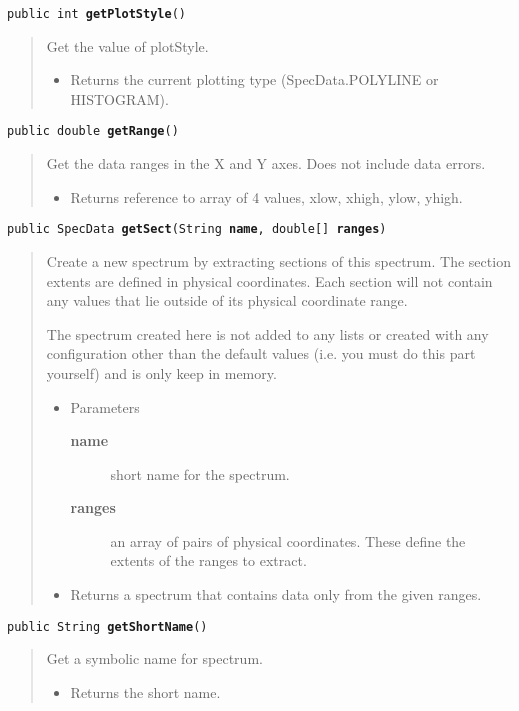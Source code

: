 \documentclass[twoside,11pt,nolof]{starlink}
\providecommand{\method}[1]{\texttt{#1}}
\newenvironment{desc}{\begin{quote}}{\end{quote}}
\begin{document}
\method{public int \textbf{getPlotStyle}()\label{l63}\label{l64}}
\begin{desc}Get the value of plotStyle.
\begin{itemize}
\item{Returns the current plotting type (SpecData.POLYLINE or
            HISTOGRAM). }
\end{itemize}
\end{desc}

\method{public double \textbf{getRange}()\label{l65}\label{l66}}
\begin{desc}Get the data ranges in the X and Y axes. Does not include data
 errors.
\begin{itemize}
\item{Returns reference to array of 4 values, xlow, xhigh, ylow, yhigh. }
\end{itemize}
\end{desc}

\method{public SpecData \textbf{getSect}(\texttt{String} \textbf{name}, \texttt{double[]} \textbf{ranges})\label{l67}\label{l68}}
\begin{desc}Create a new spectrum by extracting sections of this spectrum.
 The section extents are defined in physical coordinates.
 Each section will not contain any values that lie outside of
 its physical coordinate range.

 The spectrum created here is not added to any lists or created
 with any configuration other than the default values (i.e. you
 must do this part yourself) and is only keep in memory.
\begin{itemize}
\item{Parameters
  \begin{description}
   \item[\textbf{name}]{short name for the spectrum.}
   \item[\textbf{ranges}]{an array of pairs of physical coordinates. These
               define the extents of the ranges to extract.}
  \end{description}}
\end{itemize}
\begin{itemize}
\item{Returns a spectrum that contains data only from the given
         ranges. }
\end{itemize}
\end{desc}

\method{public String \textbf{getShortName}()\label{l69}\label{l70}}
\begin{desc}Get a symbolic name for spectrum.
\begin{itemize}
\item{Returns the short name. }
\end{itemize}
\end{desc}
\end{document}
